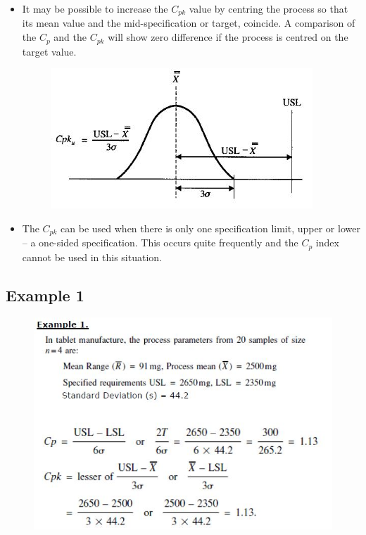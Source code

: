 \documentclass[11pt]{article} %
\begin{document}
\begin{itemize}
\item	It may be possible to increase the $C_{pk}$ value by centring the process so that its mean value and the mid-specification or target, coincide. A comparison of the $C_p$ and the $C_{pk}$ will show zero difference if the process is centred on the target value.
	
	\begin{figure}[h!]
		\centering
		\includegraphics[width=0.7\linewidth]{proccapindices/image5}
	\end{figure}
	
\item	The $C_{pk}$ can be used when there is only one specification limit, upper or lower – a one-sided specification. This occurs quite frequently and the $C_p$ index cannot be used in this situation.
\end{itemize}
\newpage

					\subsection*{Example 1}
					
					\begin{figure}[h!]
						\centering
						\includegraphics[width=1\linewidth]{proccapindices/Example1}
					\end{figure}
					
\end{document}
